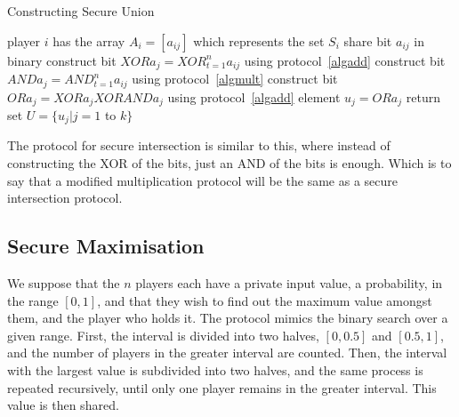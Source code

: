 \begin{algorithm}
\caption{Constructing Secure Union}
\label{algonion}
\begin{algorithmic}
\REQUIRE player $i$ has the array $A_{i} = [a_{ij}]$ which represents the set $S_{i}$
		\STATE share bit $a_{ij}$ in binary 
		\STATE construct bit $XORa_{j} = {XOR}_{t=1}^{n}a_{ij}$ using protocol~\ref{algadd}
		\STATE construct bit $ANDa_{j} = {AND}_{t=1}^{n}a_{ij}$ using protocol~\ref{algmult}
		\STATE construct bit $ORa_{j} = XORa_{j} XOR ANDa_{j}$ using protocol~\ref{algadd}
		\STATE element $u_{j} = ORa_{j}$
	\ENDFOR
\ENDFOR
\STATE return set $U = \{u_{j}|j = 1 $ to $ k\}$
\end{algorithmic}

\end{algorithm}

The protocol for secure intersection is similar to this, where instead of constructing the XOR of the 
bits, just an AND of the bits is enough. Which is to say that a modified multiplication protocol will 
be the same as a secure intersection protocol. 


\subsection{Secure Maximisation}
\label{sec:max}

We suppose that the $n$ players each have a private input value, a probability, in the range $[0,1]$, and that
they wish to find out the maximum value amongst them, and the player who holds it. The protocol mimics the binary 
search over a given range. First, the interval is divided into two halves, $[0,0.5]$ and $[0.5,1]$, and the number of
players in the greater interval are counted. Then, the interval with the largest value is subdivided into two halves,
and the same process is repeated recursively, until only one player remains in the greater interval. This 
value is then shared.

